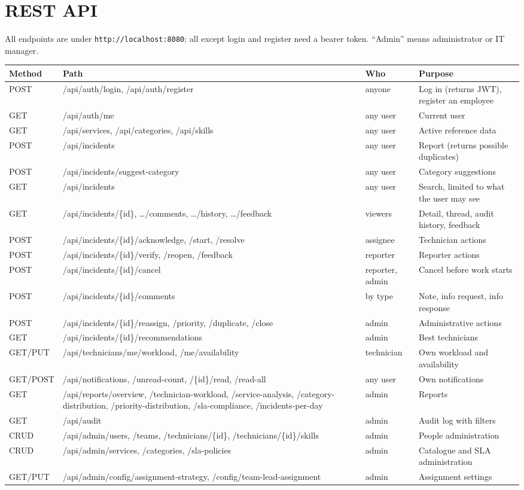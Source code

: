 \documentclass[11pt,a4paper]{article}
\begin{document}
\section{REST API}
All endpoints are under \texttt{http://localhost:8080}; all except login and register need a bearer token. “Admin” means administrator or IT manager.
\begin{longtable}{@{}p{1.4cm}p{6.6cm}p{2.1cm}p{5.4cm}@{}}
\toprule
\textbf{Method} & \textbf{Path} & \textbf{Who} & \textbf{Purpose} \\ \midrule \endhead
POST & /api/auth/login, /api/auth/register & anyone & Log in (returns JWT), register an employee \\
GET & /api/auth/me & any user & Current user \\
GET & /api/services, /api/categories, /api/skills & any user & Active reference data \\
POST & /api/incidents & any user & Report (returns possible duplicates) \\
POST & /api/incidents/suggest-category & any user & Category suggestions \\
GET & /api/incidents & any user & Search, limited to what the user may see \\
GET & /api/incidents/\{id\}, …/comments, …/history, …/feedback & viewers & Detail, thread, audit history, feedback \\
POST & /api/incidents/\{id\}/acknowledge, /start, /resolve & assignee & Technician actions \\
POST & /api/incidents/\{id\}/verify, /reopen, /feedback & reporter & Reporter actions \\
POST & /api/incidents/\{id\}/cancel & reporter, admin & Cancel before work starts \\
POST & /api/incidents/\{id\}/comments & by type & Note, info request, info response \\
POST & /api/incidents/\{id\}/reassign, /priority, /duplicate, /close & admin & Administrative actions \\
GET & /api/incidents/\{id\}/recommendations & admin & Best technicians \\
GET/PUT & /api/technicians/me/workload, /me/availability & technician & Own workload and availability \\
GET/POST & /api/notifications, /unread-count, /\{id\}/read, /read-all & any user & Own notifications \\
GET & /api/reports/overview, /technician-workload, /service-analysis, /category-distribution, /priority-distribution, /sla-compliance, /incidents-per-day & admin & Reports \\
GET & /api/audit & admin & Audit log with filters \\
CRUD & /api/admin/users, /teams, /technicians/\{id\}, /technicians/\{id\}/skills & admin & People administration \\
CRUD & /api/admin/services, /categories, /sla-policies & admin & Catalogue and SLA administration \\
GET/PUT & /api/admin/config/assignment-strategy, /config/team-lead-assignment & admin & Assignment settings \\ \bottomrule
\end{longtable}
\end{document}

